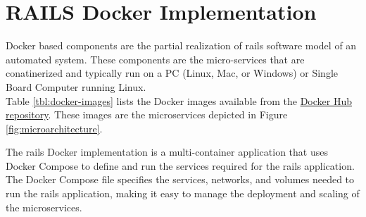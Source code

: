 \section {RAILS Docker Implementation}
Docker based components are the partial realization of \gls{rails} software model of an automated system. These components are the micro-services that are conatinerized and typically run on a PC (Linux, Mac, or Windows) or Single Board Computer running Linux.\vspace{5mm} \\
Table \ref{tbl:docker-images} lists the Docker images available from the \href{https://hub.docker.com/repositories/dbristow}{Docker Hub repository}. These images are the microservices depicted in Figure \ref{fig:microarchitecture}.

The \gls{rails} Docker implementation is a multi-container application that uses Docker Compose to define and run the services required for the \gls{rails} application. The Docker Compose file specifies the services, networks, and volumes needed to run the \gls{rails} application, making it easy to manage the deployment and scaling of the microservices.
